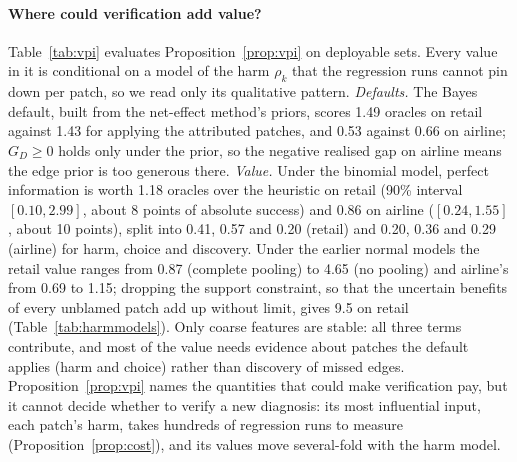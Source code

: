 \documentclass[11pt]{article}
\begin{document}
\begin{table}[t]
\centering
\small
\setlength{\tabcolsep}{3pt}
\caption{Value of perfect verification over two no-evidence defaults, deployable sets, posterior means under the task-level binomial harm model (Appendix~\ref{app:harm}) as fractions of the repair-only oracle. \emph{Gap}: Bayes default minus Apply attributed ($G_D$ with the sign reversed; negative when the heuristic does better). Harm, choice and discovery are added in that order: dropping default patches with negative net effect, then the best cell and patch on the default's components, then any other component. Indented rows give the value over Apply at $c=0$ under the normal-approximation harm models of an earlier analysis (partial, complete and no pooling, tasks resampled before fitting) and with the additive per-cell form of Proposition~\ref{prop:vpi} instead of deployable sets. A value of 1 is 0.070 (retail) or 0.114 (airline) in absolute success.}
\label{tab:vpi}
\end{table}

\paragraph{Where could verification add value?} Table~\ref{tab:vpi} evaluates Proposition~\ref{prop:vpi} on deployable sets. Every value in it is conditional on a model of the harm $\rho_k$ that the regression runs cannot pin down per patch, so we read only its qualitative pattern. \emph{Defaults.} The Bayes default, built from the net-effect method's priors, scores 1.49 oracles on retail against 1.43 for applying the attributed patches, and 0.53 against 0.66 on airline; $G_D\ge0$ holds only under the prior, so the negative realised gap on airline means the edge prior is too generous there. \emph{Value.} Under the binomial model, perfect information is worth 1.18 oracles over the heuristic on retail (90\% interval $[0.10,2.99]$, about 8 points of absolute success) and 0.86 on airline ($[0.24,1.55]$, about 10 points), split into 0.41, 0.57 and 0.20 (retail) and 0.20, 0.36 and 0.29 (airline) for harm, choice and discovery. Under the earlier normal models the retail value ranges from 0.87 (complete pooling) to 4.65 (no pooling) and airline's from 0.69 to 1.15; dropping the support constraint, so that the uncertain benefits of every unblamed patch add up without limit, gives 9.5 on retail (Table~\ref{tab:harmmodels}). Only coarse features are stable: all three terms contribute, and most of the value needs evidence about patches the default applies (harm and choice) rather than discovery of missed edges. Proposition~\ref{prop:vpi} names the quantities that could make verification pay, but it cannot decide whether to verify a new diagnosis: its most influential input, each patch's harm, takes hundreds of regression runs to measure (Proposition~\ref{prop:cost}), and its values move several-fold with the harm model.
\end{document}
